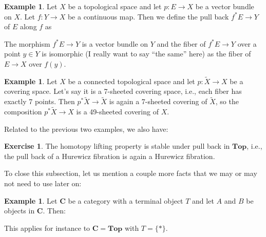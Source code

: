\documentclass[12pt,reqno,a4paper]{amsart}
\theoremstyle{plain}
\theoremstyle{definition}
\newtheorem{exmp}[thm]{Example}
\newtheorem{xca}[thm]{Exercise}
\theoremstyle{remark}
\begin{document}
\begin{exmp}
  Let $X$ be a topological space and let $p \colon E \to X$ be a vector bundle on $X$.
  Let $f \colon Y \to X$ be a continuous map.
  Then we define the pull back $f^{*}E \to Y$ of $E$ along $f$ as
  \begin{center}
  \end{center}
  The morphism $f^{*}E \to Y$ is a vector bundle on $Y$ and the fiber of $f^{*}E \to Y$ over a point $y \in Y$ is isomorphic (I really want to say ``the same'' here) as the fiber of $E \to X$ over $f(y)$.
\end{exmp}

\begin{exmp}
  Let $X$ be a connected topological space and let $p \colon \tilde{X} \to X$ be a covering space.
  Let's say it is a 7-sheeted covering space, i.e., each fiber has exactly 7 points.
  Then $p^{*}\tilde{X} \to \tilde{X}$ is again a 7-sheeted covering of $\tilde{X}$, so the composition $p^{*}\tilde{X} \to X$ is a 49-sheeted covering of $X$.
\end{exmp}

Related to the previous two examples, we also have:

\begin{xca}
  The homotopy lifting property is stable under pull back in $\mathbf{Top}$, i.e., the pull back of a Hurewicz fibration is again a Hurewicz fibration.
\end{xca}

To close this subsection, let us mention a couple more facts that we may or may not need to use later on:

\begin{exmp}
  Let $\mathbf{C}$ be a category with a terminal object $T$ and let $A$ and $B$ be objects in $\mathbf{C}$.
  Then:
  \begin{center}
  \end{center}
  This applies for instance to $\mathbf{C} = \mathbf{Top}$ with $T = \{ * \}$.
\end{exmp}
\end{document}
